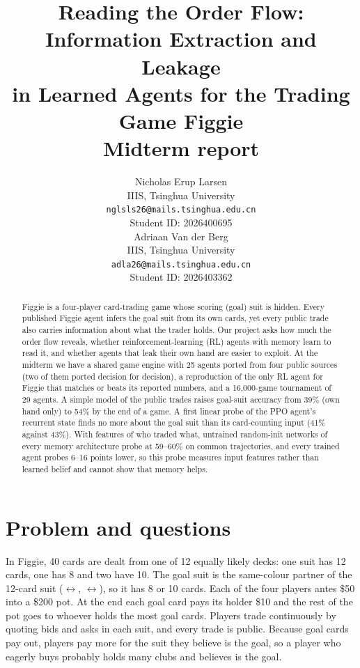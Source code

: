 \documentclass{article}
\title{Reading the Order Flow: Information Extraction and Leakage\\in Learned Agents for the Trading Game Figgie\\[4pt]\large Midterm report}
\author{%
  Nicholas Erup Larsen \\
  IIIS, Tsinghua University \\
  \texttt{nglsls26@mails.tsinghua.edu.cn} \\
  Student ID: 2026400695 \\
  \And
  Adriaan Van der Berg \\
  IIIS, Tsinghua University \\
  \texttt{adla26@mails.tsinghua.edu.cn} \\
  Student ID: 2026403362 \\
}
\newcommand{\Spade}{\ding{171}}
\newcommand{\Club}{\ding{168}}
\newcommand{\Heart}{\textcolor{red!75!black}{\ding{170}}}
\newcommand{\Diam}{\textcolor{red!75!black}{\ding{169}}}
\begin{document}
\maketitle

\begin{abstract}
Figgie is a four-player card-trading game whose scoring (goal) suit is hidden.
Every published Figgie agent infers the goal suit from its own cards, yet every public trade also carries information about what the trader holds.
Our project asks how much the order flow reveals, whether reinforcement-learning (RL) agents with memory learn to read it, and whether agents that leak their own hand are easier to exploit.
At the midterm we have a shared game engine with 25 agents ported from four public sources (two of them ported decision for decision), a reproduction of the only RL agent for Figgie that matches or beats its reported numbers, and a 16{,}000-game tournament of 29 agents.
A simple model of the public trades raises goal-suit accuracy from 39\% (own hand only) to 54\% by the end of a game.
A first linear probe of the PPO agent's recurrent state finds no more about the goal suit than its card-counting input (41\% against 43\%).
With features of who traded what, untrained random-init networks of every memory architecture probe at 59--60\% on common trajectories, and every trained agent probes 6--16 points lower, so this probe measures input features rather than learned belief and cannot show that memory helps.
\end{abstract}

\section{Problem and questions}
In Figgie, 40 cards are dealt from one of 12 equally likely decks: one suit has 12 cards, one has 8 and two have 10.
The goal suit is the same-colour partner of the 12-card suit (\Spade$\leftrightarrow$\Club, \Heart$\leftrightarrow$\Diam), so it has 8 or 10 cards.
Each of the four players antes \$50 into a \$200 pot. At the end each goal card pays its holder \$10 and the rest of the pot goes to whoever holds the most goal cards.
Players trade continuously by quoting bids and asks in each suit, and every trade is public.
Because goal cards pay out, players pay more for the suit they believe is the goal, so a player who eagerly buys \Club{} probably holds many clubs and believes \Club{} is the goal.
\end{document}
